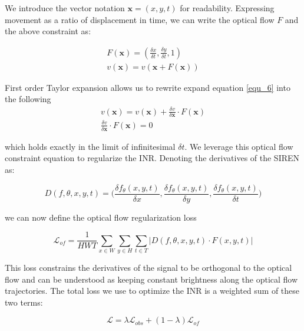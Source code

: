 \documentclass{article}
\begin{document}
We introduce the vector notation $\textbf{x}=(x,y,t)$ for readability.
Expressing movement as a ratio of displacement in time,
we can write the optical flow $F$ and the above constraint as:

\begin{equation}
\begin{aligned}
F(\textbf{x})=(\frac{\delta x}{\delta t}, \frac{\delta y}{\delta t}, 1) \\
v(\textbf{x})=v(\textbf{x} + F(\textbf{x}))
\end{aligned}
\label{equ_6}
\end{equation}

First order Taylor expansion allows us to rewrite expand equation \ref{equ_6} into the following
\begin{equation}
\begin{aligned}
v(\textbf{x}) = v(\textbf{x}) + \frac{\delta v}{\delta \textbf{x}} \cdot F(\textbf{x}) \\
\frac{\delta v}{\delta \textbf{x}} \cdot F(\textbf{x}) =0
\end{aligned}
\end{equation}


which holds exactly in the limit of infinitesimal $\delta t$.
We leverage this optical flow constraint equation to regularize the INR.
Denoting the derivatives of the SIREN as:

\begin{equation}
D(f, \theta, x, y, t)=\Big(\frac{\delta f_{\theta}(x,y,t)}{\delta x}, \frac{\delta f_{\theta}(x,y,t)}{\delta y}, \frac{\delta f_{\theta}(x,y,t)}{\delta t}\Big)
\end{equation}

we can now define the optical flow regularization loss

\begin{equation}
\mathcal{L}_{of} = \frac{1}{HWT} \sum_{x \in W}\sum_{y \in H}\sum_{t \in T} | D(f, \theta, x, y, t) \cdot F(x, y, t) |
\end{equation}

This loss constrains the derivatives of the signal to be orthogonal to the optical flow and
can be understood as keeping constant brightness along the optical flow trajectories.
The total loss we use to optimize the INR is a weighted sum of these two terms:

\begin{equation}
\mathcal{L} = \lambda \mathcal{L}_{obs} + (1-\lambda) \mathcal{L}_{of}
\end{equation}
\end{document}
